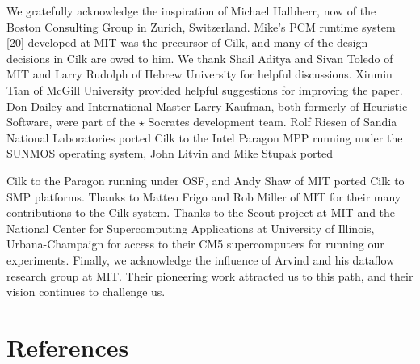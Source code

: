 \documentclass[
]{article}
\begin{document}
We gratefully acknowledge the inspiration of Michael Halbherr, now of
the Boston Consulting Group in Zurich, Switzerland. Mike's PCM runtime
system {[}20{]} developed at MIT was the precursor of Cilk, and many of
the design decisions in Cilk are owed to him. We thank Shail Aditya and
Sivan Toledo of MIT and Larry Rudolph of Hebrew University for helpful
discussions. Xinmin Tian of McGill University provided helpful
suggestions for improving the paper. Don Dailey and International Master
Larry Kaufman, both formerly of Heuristic Software, were part of the
\(\star\) Socrates development team. Rolf Riesen of Sandia National
Laboratories ported Cilk to the Intel Paragon MPP running under the
SUNMOS operating system, John Litvin and Mike Stupak ported

Cilk to the Paragon running under OSF, and Andy Shaw of MIT ported Cilk
to SMP platforms. Thanks to Matteo Frigo and Rob Miller of MIT for their
many contributions to the Cilk system. Thanks to the Scout project at
MIT and the National Center for Supercomputing Applications at
University of Illinois, Urbana-Champaign for access to their CM5
supercomputers for running our experiments. Finally, we acknowledge the
influence of Arvind and his dataflow research group at MIT. Their
pioneering work attracted us to this path, and their vision continues to
challenge us.

\section{References}\label{references}
\end{document}
